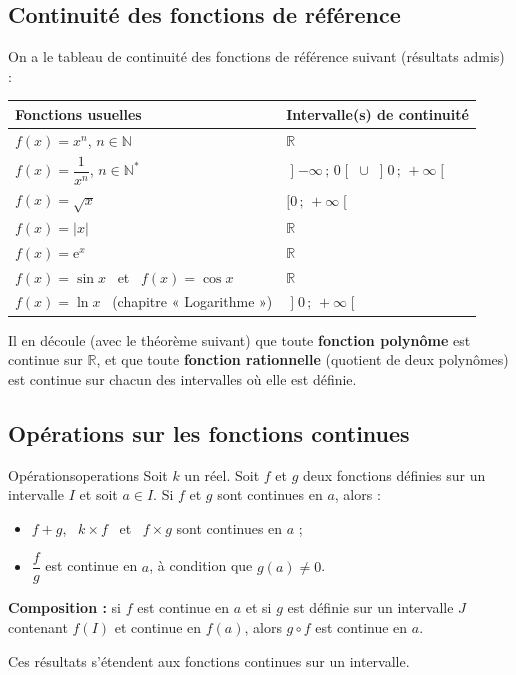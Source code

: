 \documentclass[11pt,a4paper]{article}
\newcommand{\R}{\mathbb{R}}
\newcommand{\N}{\mathbb{N}}
\newcommand{\e}{\mathrm{e}}
\newcommand{\intoo}[2]{\mathopen{]}#1\,;\,#2\mathclose{[}}
\newcommand{\intfo}[2]{\mathopen{[}#1\,;\,#2\mathclose{[}}
\begin{document}
\subsection{Continuité des fonctions de référence}

On a le tableau de continuité des fonctions de référence suivant (résultats admis) :

\begin{center}
\renewcommand{\arraystretch}{1.4}
\begin{tabular}{|>{\centering\arraybackslash}m{6.6cm}|>{\centering\arraybackslash}m{6.6cm}|}
\hline
\rowcolor{bleuclair}\textbf{Fonctions usuelles} & \textbf{Intervalle(s) de continuité} \\ \hline
$f(x)=x^n$, \quad $n\in\N$ & $\R$ \\ \hline
$f(x)=\dfrac{1}{x^n}$, \quad $n\in\N^*$ & $\intoo{-\infty}{0}\;\cup\;\intoo{0}{+\infty}$ \\ \hline
$f(x)=\sqrt{x}$ & $\intfo{0}{+\infty}$ \\ \hline
$f(x)=\lvert x\rvert$ & $\R$ \\ \hline
$f(x)=\e^x$ & $\R$ \\ \hline
$f(x)=\sin x$ \ et \ $f(x)=\cos x$ & $\R$ \\ \hline
$f(x)=\ln x$ \ {\small(chapitre « Logarithme »)} & $\intoo{0}{+\infty}$ \\ \hline
\end{tabular}
\end{center}

\begin{remarque}
Il en découle (avec le théorème suivant) que toute \textbf{fonction polynôme}
est continue sur $\R$, et que toute \textbf{fonction rationnelle} (quotient de
deux polynômes) est continue sur chacun des intervalles où elle est définie.
\end{remarque}

\subsection{Opérations sur les fonctions continues}

\begin{theoreme}{Opérations}{operations}
Soit $k$ un réel. Soit $f$ et $g$ deux fonctions définies sur un intervalle $I$
et soit $a\in I$. Si $f$ et $g$ sont continues en $a$, alors :
\begin{itemize}
  \item $f+g$, \ $k\times f$ \ et \ $f\times g$ sont continues en $a$ ;
  \item $\dfrac{f}{g}$ est continue en $a$, à condition que $g(a)\neq 0$.
\end{itemize}
\textbf{Composition :} si $f$ est continue en $a$ et si $g$ est définie sur un
intervalle $J$ contenant $f(I)$ et continue en $f(a)$, alors $g\circ f$ est
continue en $a$.

Ces résultats s'étendent aux fonctions continues sur un intervalle.
\end{theoreme}
\end{document}
